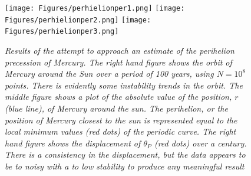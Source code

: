 \documentclass[%
reprint,nofootinbib,
amsmath,amssymb,
aps,
]{revtex4-1}
\begin{document}
\vspace{2cm}

\begin{figure}[H]
	\texttt{[image: Figures/perhielionper1.png]} \hspace{2mm}
	\texttt{[image: Figures/perhielionper2.png]} \hspace{2mm}
	\texttt{[image: Figures/perhielionper3.png]}
	\vspace{5mm}
	\caption{\label{Merc} \textit{Results of the attempt to approach an estimate of the perihelion precession of Mercury. The right hand figure shows the orbit of Mercury around the Sun over a period of 100 years, using $N = 10^8$ points. There is evidently some instability trends in the orbit. The middle figure shows a plot of the absolute value of the position, $r$ (blue line), of Mercury around the sun. The perihelion, or the position of Mercury closest to the sun is represented equal to the local minimum values (red dots) of the periodic curve. The right hand figure shows the displacement of $\theta_P$ (red dots) over a century. There is a consistency in the displacement, but the data appears to be to noisy with a to low stability to produce any meaningful result}}
\end{figure}

\newpage 

\twocolumngrid 
\end{document}
